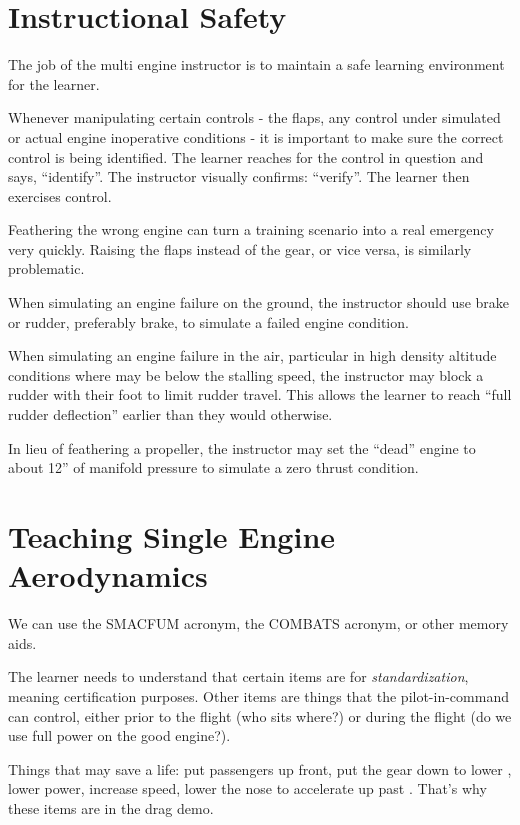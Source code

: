 {\section{Instructional Safety}

The job of the multi engine instructor is to maintain a safe learning environment for the learner.

Whenever manipulating certain controls - the flaps, any control under simulated or actual engine inoperative conditions -
it is important to make sure the correct control is being identified. The learner reaches for the control in question and
says, ``identify''. The instructor visually confirms: ``verify''. The learner then exercises control.

Feathering the wrong engine can turn a training scenario into a real emergency very quickly. Raising the flaps
instead of the gear, or vice versa, is similarly problematic.

When simulating an engine failure on the ground, the instructor should use brake or rudder, preferably brake,
to simulate a failed engine condition.

When simulating an engine failure in the air, particular in high density altitude conditions where \vmc may be
below the stalling speed, the instructor may block a rudder with their foot to limit rudder travel. This allows the
learner to reach ``full rudder deflection'' earlier than they would otherwise.

In lieu of feathering a propeller, the instructor may set the ``dead'' engine to about 12'' of manifold pressure
to simulate a zero thrust condition.

\section{Teaching Single Engine Aerodynamics}

We can use the SMACFUM acronym, the COMBATS acronym, or other memory aids.

The learner needs to understand that certain items are for \emph{standardization}, meaning
certification purposes. Other items are things that the pilot-in-command can control, either prior
to the flight (who sits where?) or during the flight (do we use full power on the good engine?).

Things that may save a life: put passengers up front, put the gear down to lower \vmc, lower power, increase speed, lower the nose to accelerate up past \vmc. That's why these items are in the drag demo.

}
